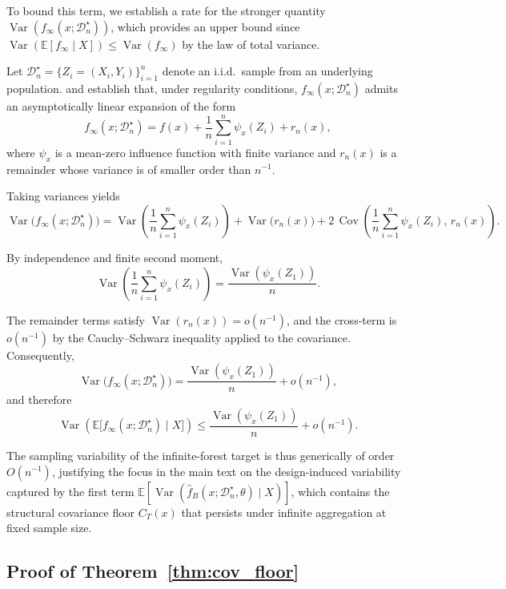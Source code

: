 \documentclass[11pt]{article}
\theoremstyle{plain}
\theoremstyle{definition}
\theoremstyle{remark}
\DeclareMathOperator{\Var}{Var}
\DeclareMathOperator{\Cov}{Cov}
\begin{document}
To bound this term, we establish a rate for the stronger quantity $\Var(f_\infty(x;\mathcal D_n^\star))$, which provides an upper bound since $\Var(\mathbb E[f_\infty\mid X])\le \Var(f_\infty)$ by the law of total variance.

Let $\mathcal D_n^\star=\{Z_i=(X_i,Y_i)\}_{i=1}^n$ denote an i.i.d.\ sample from an underlying population. \citet{mentch2016} and \citet{wager2018} establish that, under regularity conditions, $f_\infty(x;\mathcal D_n^\star)$ admits an asymptotically linear expansion of the form
\[
f_\infty(x;\mathcal D_n^\star)
=
f(x)
+
\frac{1}{n}\sum_{i=1}^n \psi_x(Z_i)
+
r_n(x),
\]
where $\psi_x$ is a mean-zero influence function with finite variance and $r_n(x)$ is a remainder whose variance is of smaller order than $n^{-1}$.

Taking variances yields
\[
\Var\!\bigl(f_\infty(x;\mathcal D_n^\star)\bigr)
=
\Var\!\left(\frac{1}{n}\sum_{i=1}^n \psi_x(Z_i)\right)
+
\Var\!\bigl(r_n(x)\bigr)
+
2\,\Cov\!\left(\frac{1}{n}\sum_{i=1}^n \psi_x(Z_i),\,r_n(x)\right).
\]

By independence and finite second moment,
\[
\Var\!\left(\frac{1}{n}\sum_{i=1}^n \psi_x(Z_i)\right)
=
\frac{\Var(\psi_x(Z_1))}{n}.
\]

The remainder terms satisfy $\Var(r_n(x))=o(n^{-1})$, and the cross-term is $o(n^{-1})$ by the Cauchy--Schwarz inequality applied to the covariance. Consequently,
\[
\Var\!\bigl(f_\infty(x;\mathcal D_n^\star)\bigr)
=
\frac{\Var(\psi_x(Z_1))}{n}
+
o(n^{-1}),
\]
and therefore
\[
\Var\!\left(
\mathbb E\!\bigl[f_\infty(x;\mathcal D_n^\star)\mid X\bigr]
\right)
\le
\frac{\Var(\psi_x(Z_1))}{n}
+
o(n^{-1}).
\]

The sampling variability of the infinite-forest target is thus generically of order $O(n^{-1})$, justifying the focus in the main text on the design-induced variability captured by the first term $\mathbb E[\Var(\hat f_B(x;\mathcal D_n^\star,\theta)\mid X)]$, which contains the structural covariance floor $C_T(x)$ that persists under infinite aggregation at fixed sample size.

	

\subsection{Proof of Theorem~\ref{thm:cov_floor}}
\label{app:proof_strict_covariance}
\end{document}
